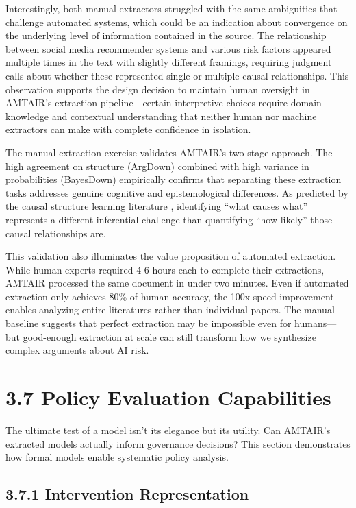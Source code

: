 \documentclass[
  11pt,
  letterpaper,
  openany]{book}
\begin{document}
Interestingly, both manual extractors struggled with the same
ambiguities that challenge automated systems, which could be an
indication about convergence on the underlying level of information
contained in the source. The relationship between social media
recommender systems and various risk factors appeared multiple times in
the text with slightly different framings, requiring judgment calls
about whether these represented single or multiple causal relationships.
This observation supports the design decision to maintain human
oversight in AMTAIR's extraction pipeline---certain interpretive choices
require domain knowledge and contextual understanding that neither human
nor machine extractors can make with complete confidence in isolation.

The manual extraction exercise validates AMTAIR's two-stage approach.
The high agreement on structure (ArgDown) combined with high variance in
probabilities (BayesDown) empirically confirms that separating these
extraction tasks addresses genuine cognitive and epistemological
differences. As predicted by the causal structure learning literature
\textcite{heinze-deml2018} \textcite{squires2023}, identifying ``what
causes what'' represents a different inferential challenge than
quantifying ``how likely'' those causal relationships are.

This validation also illuminates the value proposition of automated
extraction. While human experts required 4-6 hours each to complete
their extractions, AMTAIR processed the same document in under two
minutes. Even if automated extraction only achieves 80\% of human
accuracy, the 100x speed improvement enables analyzing entire
literatures rather than individual papers. The manual baseline suggests
that perfect extraction may be impossible even for humans---but
good-enough extraction at scale can still transform how we synthesize
complex arguments about AI risk.

\section{3.7 Policy Evaluation
Capabilities}\label{sec-policy-evaluation}

The ultimate test of a model isn't its elegance but its utility. Can
AMTAIR's extracted models actually inform governance decisions? This
section demonstrates how formal models enable systematic policy
analysis.

\subsection{3.7.1 Intervention
Representation}\label{sec-intervention-representation}
\end{document}
